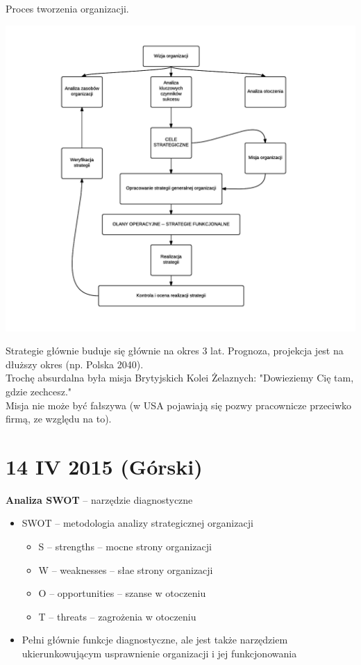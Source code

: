 \documentclass[a4paper,10pt]{report}
\begin{document}
Proces tworzenia organizacji. 
\begin{center}
	\includegraphics[scale=0.7]{assets/procestworzeniastrategii.png}
\end{center}

Strategie głównie buduje się głównie na okres 3 lat. Prognoza, projekcja jest na dłuższy okres (np. Polska 2040).
\\
Trochę absurdalna była misja Brytyjskich Kolei Żelaznych: "Dowieziemy Cię tam, gdzie zechcesz."
\\
Misja nie może być fałszywa (w USA pojawiają się pozwy pracownicze przeciwko firmą, ze względu na to).

\section{14 IV 2015 (Górski)}

\textbf{Analiza SWOT} -- narzędzie diagnostyczne
\begin{itemize}
	\item SWOT -- metodologia analizy strategicznej organizacji
	\begin{itemize}
		\item S -- strengths -- mocne strony organizacji
		\item W -- weaknesses -- słae strony organizacji
		\item O -- opportunities -- szanse w otoczeniu
		\item T -- threats -- zagrożenia w otoczeniu
	\end{itemize}
	\item Pełni głównie funkcje diagnostyczne, ale jest także narzędziem ukierunkowującym usprawnienie organizacji i jej funkcjonowania
\end{itemize}
\end{document}
